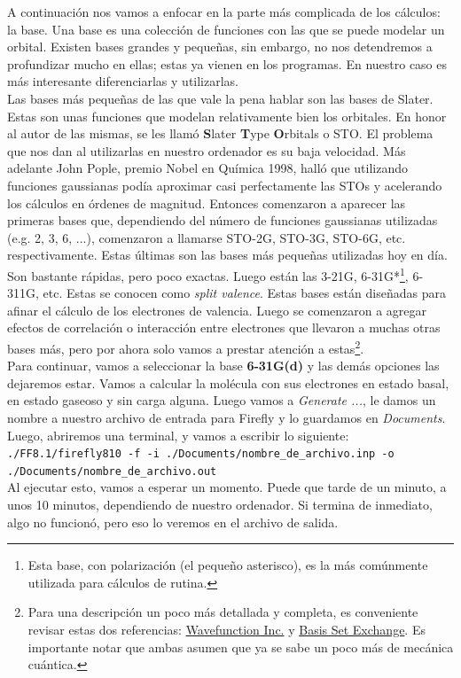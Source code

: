 \documentclass[10pt,letterpaper]{article}
\newcommand{\inlinecode}[1]{
\colorbox{light-gray}{\texttt{#1}}
}
\begin{document}
A continuaci\'on nos vamos a enfocar en la parte m\'as complicada de los c\'alculos: la base. Una base es una colecci\'on de funciones con las que se puede modelar un orbital. Existen bases grandes y peque\~nas, sin embargo, no nos detendremos a profundizar mucho en ellas; estas ya vienen en los programas. En nuestro caso es m\'as interesante diferenciarlas y utilizarlas.\\

Las bases m\'as peque\~nas de las que vale la pena hablar son las bases de Slater. Estas son unas funciones que modelan relativamente bien los orbitales. En honor al autor de las mismas, se les llam\'o \textbf{S}later \textbf{T}ype \textbf{O}rbitals o STO. El problema que nos dan al utilizarlas en nuestro ordenador es su baja velocidad. M\'as adelante John Pople, premio Nobel en Qu\'imica 1998, hall\'o que utilizando funciones gaussianas pod\'ia aproximar casi perfectamente las STOs y acelerando los c\'alculos en \'ordenes de magnitud. Entonces comenzaron a aparecer las primeras bases que, dependiendo del n\'umero de funciones gaussianas utilizadas (e.g. 2, 3, 6, ...), comenzaron a llamarse STO-2G, STO-3G, STO-6G, etc. respectivamente. Estas \'ultimas son las bases m\'as peque\~nas utilizadas hoy en d\'ia. Son bastante r\'apidas, pero poco exactas. Luego est\'an las 3-21G, 6-31G*\footnote{Esta base, con polarizaci\'on (el peque\~no asterisco), es la m\'as com\'unmente utilizada para c\'alculos de rutina.}, 6-311G, etc. Estas se conocen como \emph{split valence}. Estas bases est\'an dise\~nadas para afinar el c\'alculo de los electrones de valencia. Luego se comenzaron a agregar efectos de correlaci\'on o interacci\'on entre electrones que llevaron a muchas otras bases m\'as, pero por ahora solo vamos a prestar atenci\'on a estas\footnote{Para una descripci\'on un poco m\'as detallada y completa, es conveniente revisar estas dos referencias: \href{https://www.wavefun.com/support/sp_compfaq/Basis_Set_FAQ.html}{Wavefunction Inc.} y \href{https://bse.pnl.gov/bse/portal}{Basis Set Exchange}. Es importante notar que ambas asumen que ya se sabe un poco m\'as de mec\'anica cu\'antica.}.\\

Para continuar, vamos a seleccionar la base \textbf{6-31G(d)} y las dem\'as opciones las dejaremos estar. Vamos a calcular la mol\'ecula con sus electrones en estado basal, en estado gaseoso y sin carga alguna. Luego vamos a \textit{Generate ...}, le damos un nombre a nuestro archivo de entrada para Firefly y lo guardamos en \textit{Documents}. Luego, abriremos una terminal, y vamos a escribir lo siguiente:\\
\inlinecode{./FF8.1/firefly810 -f -i ./Documents/nombre\_de\_archivo.inp -o ./Documents/nombre\_de\_archivo.out}\\
Al ejecutar esto, vamos a esperar un momento. Puede que tarde de un minuto, a unos 10 minutos, dependiendo de nuestro ordenador. Si termina de inmediato, algo no funcion\'o, pero eso lo veremos en el archivo de salida.\\
\end{document}
